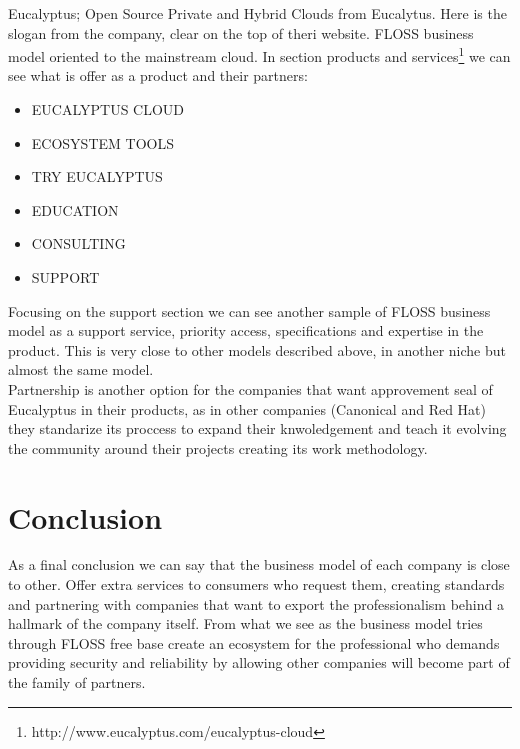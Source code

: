 \documentclass[11pt]{scrartcl}
\begin{document}
 Eucalyptus; Open Source Private and Hybrid Clouds from Eucalytus. Here is the 
 slogan from the company, clear on the top of theri website. FLOSS business model
 oriented to the mainstream cloud.
 In section products and services\footnote{http://www.eucalyptus.com/eucalyptus-cloud} 
 we can see what is offer as a product and their partners:
 \begin{itemize}
  \item EUCALYPTUS CLOUD
  \item ECOSYSTEM TOOLS
  \item TRY EUCALYPTUS
  \item EDUCATION
  \item CONSULTING
  \item SUPPORT
\end{itemize}
 Focusing on the support section we can see another sample of FLOSS business model
 as a support service, priority access, specifications and expertise in the product.
 This is very close to other models described above, in another niche but almost the same
 model.\\
 Partnership is another option for the companies that want approvement seal of 
 Eucalyptus in their products, as in other companies (Canonical and Red Hat) they 
 standarize its proccess to expand their knwoledgement and teach it evolving the
  community around their projects creating its work methodology.
 
\section{Conclusion}

As a final conclusion we can say that the business model of each company is 
close to other. Offer extra services to consumers who request them, 
creating standards and partnering with companies that want to export
 the professionalism behind a hallmark of the company itself. 
From what we see as the business model tries through FLOSS free
 base create an ecosystem for the professional who demands 
providing security and reliability by allowing other companies will become 
part of the family of partners. 
\end{document}

